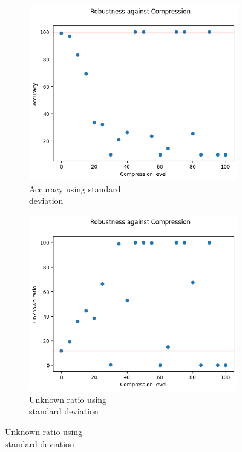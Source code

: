 \begin{figure}[H]
	\centering
	\begin{subfigure}{.33\textwidth}
		\centering
		\includegraphics[width=0.9\linewidth]{ImageFiles/EvalBNN/CO/VU/acc}
		\caption{Accuracy using standard \\ deviation}
		\label{fig:co_vu_acc}
	\end{subfigure}%
	\begin{subfigure}{.33\textwidth}
		\centering
		\includegraphics[width=0.9\linewidth]{ImageFiles/EvalBNN/CO/VU/unkn}
		\caption{Unknown ratio using \\ standard deviation}
		\label{fig:co_vu_unkn}
	\end{subfigure}%

\end{figure}
